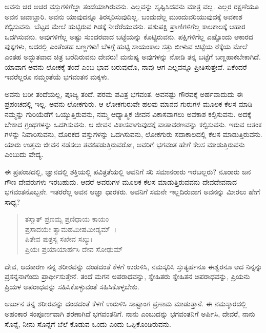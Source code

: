 ಅವನು ಚರ ಅಚರ ವಸ್ತುಗಳಿಗೆಲ್ಲಾ ತಂದೆಯಾಗಿರುವನು. ಎಲ್ಲವನ್ನು ಸೃಷ್ಟಿಸಿದವನು ಮಾತ್ರ ವಲ್ಲ. ಎಲ್ಲರ ರಕ್ಷಣೆಯೂ ಅವನ ಜವಾಬ್ದಾರಿ. ಅವನು ಯಾವುದನ್ನೂ ತಿರಸ್ಕರಿಸುವುದಿಲ್ಲ. ಬಂದುದೆಲ್ಲ ಮುಂದುವರಿಯುವುದಕ್ಕೆ ಅವಕಾಶ ಕಲ್ಪಿಸುವನು. ಬೆಟ್ಟದ ಮೇಲೆ ಹುಟ್ಟಿರುವ ಗಿಡಕ್ಕೆ ನೀರೆರೆಯುವನು. ಪಶುಪಕ್ಷಿ ಪ್ರಾಣಿಗಳಿಗೆಲ್ಲ ಕಾಲಕಾಲಕ್ಕೆ ಆಹಾರ ಒದಗಿಸುವನು. ಅವುಗಳಿಗೆಲ್ಲ ಅಷ್ಟು ಸುಂದರವಾದ ಬಟ್ಟೆಯನ್ನು ಕೊಟ್ಟಿರುವನು. ಪಕ್ಷಿಗಳಿಗೆಲ್ಲ ಎಷ್ಟೊಂದು ಆಕಾರದ ಪುಕ್ಕಗಳು, ಅದರಲ್ಲಿ ಎಂತೆಂತಹ ಬಣ್ಣಗಳು! ಬೆಳಗ್ಗೆ ಹುಟ್ಟಿ ಸಾಯಂಕಾಲ ಸತ್ತು ಬೀಳುವ ಚಿಟ್ಟೆಯ ರೆಕ್ಕೆಯ ಮೇಲೆ ಎಂತಹ ಅದ್ಭುತವಾದ ಚಿತ್ರ ಬರೆದಿರುವನು ದೇವರು! ಮನುಷ್ಯ ಅವುಗಳನ್ನು ನೋಡಿ ತನ್ನ ಬಟ್ಟೆಗೆ ಬಣ್ಣಹಾಕಬೇಕಾಗಿದೆ. ಯಾವಾಗ ಅವನು ಲೋಕಕ್ಕೆ ತಂದೆ ಎಂಬ ಭಾವ ಬರುವುದೊ, ನಾವು ಆಗ ಎಲ್ಲವನ್ನೂ ಪ್ರೀತಿಸುತ್ತೇವೆ. ಏಕೆಂದರೆ ಇವರೆಲ್ಲರೂ ನಮ್ಮಂತೆಯೆ ಭಗವಂತನ ಮಕ್ಕಳು.

ಅವನು ಬರೀ ತಂದೆಯಲ್ಲ, ಪೂಜ್ಯ ತಂದೆ. ಪರಮ ಪವಿತ್ರ ಭಗವಂತ. ಅವನಷ್ಟು ಗೌರವಕ್ಕೆ ಅರ್ಹವಾದುದು ಈ ಪ್ರಪಂಚದಲ್ಲಿ ಇಲ್ಲ. ಅವನು ಲೋಕಗುರು. ಆ ಲೋಕಗುರುವೇ ಹಲವು ಮಾನವ ಗುರುಗಳ ಮೂಲಕ ಕೆಲಸ ಮಾಡಿ ನಮ್ಮನ್ನು ಗುರಿಯೆಡೆಗೆ ಒಯ್ಯುತ್ತಿರುವನು, ನಮ್ಮ ಆಧ್ಯಾತ್ಮಿಕ ಜೀವನ ವಿಕಾಸವಾಗಲು ಅವಕಾಶ ಕಲ್ಪಿಸುವನು. ಅದಕ್ಕೆ ಬೇಕಾದ ಗ್ರಂಥಗಳನ್ನು ಒದಗಿಸುವನು. ಆ ಜೀವನ ವಿಕಾಸವಾಗುವುದಕ್ಕೆ ವಾತಾವರಣವನ್ನು ಕಲ್ಪಿಸುವನು. ಇರುವ ಆತಂಕ ಗಳನ್ನು ನಿವಾರಿಸುವನು, ದೊರಕದ ವಸ್ತುಗಳನ್ನು ಒದಗಿಸುವನು, ಲೋಕಗುರು ಸದಾಕಾಲದಲ್ಲಿ ಕೆಲಸ ಮಾಡುತ್ತಿರುವನು. ಯಾರು ಉತ್ತಮ ಜೀವನ ನಡೆಸಲು ತವಕಪಡುತ್ತಿರುವರೋ, ಅವರಿಗೆ ಭಗವಂತ ಹೇಗೆ ಕೆಲಸ ಮಾಡುತ್ತಿರುವನು ಎಂಬುದು ವೇದ್ಯ.

ಈ ಪ್ರಪಂಚದಲ್ಲಿ, ಜ್ಞಾನದಲ್ಲಿ ಶಕ್ತಿಯಲ್ಲಿ ಪವಿತ್ರತೆಯಲ್ಲಿ ಅವನಿಗೆ ಸರಿ ಸಮಾನರಾರು ಇರಬಲ್ಲರು? ನೂರಾರು ಜನ ಗೌಣ ದೇವರುಗಳು ಇರಬಹುದು. ಆದರೆ ಅವರುಗಳ ಮೂಲಕ ಕೆಲಸ ಮಾಡುತ್ತಿರುವವನು ದೇವದೇವನಾದ ಭಗವಂತನೊಬ್ಬನೇ. ಇತರರೆಲ್ಲ ಅವನ ಆಜ್ಞಾ ಧಾರಕರು. ಅವನಿಗೆ ಸಮನೇ ಇಲ್ಲದಿರುವಾಗ ಅವನನ್ನು ಮೀರಲು ಹೇಗೆ ಸಾಧ್ಯ?

\begin{verse}
ತಸ್ಮಾತ್ ಪ್ರಣಮ್ಯ ಪ್ರಣಿಧಾಯ ಕಾಯಂ \\ ಪ್ರಸಾದಯೇ ತ್ವಾಮಹಮೀಷಮೀಡ್ಯಮ್~।\\ಪಿತೇವ ಪುತ್ರಸ್ಯ ಸಖೇವ ಸಖ್ಯುಃ \\ ಪ್ರಿಯಃ ಪ್ರಯಾಯಾರ್ಹಸಿ ದೇವ ಸೋಢುಮ್ 
\end{verse}

{\small ದೇವ, ಆದಕಾರಣ ನನ್ನ ಶರೀರವನ್ನು ದಂಡದಂತೆ ಕೆಳಗೆ ಉರುಳಿಸಿ, ನಮಸ್ಕರಿಸಿ ಸ್ತುತ್ಯರ್ಹನೂ ಈಶ್ವರನೂ ಆದ ನಿನ್ನನ್ನು ಪ್ರಸನ್ನನಾಗೆಂದು ಪ್ರಾರ್ಥೀಸುತ್ತೇನೆ. ತಂದೆ ಮಗನ ಅಪರಾಧವನ್ನು, ಸ್ನೇಹಿತರು ಸ್ನೇಹಿತನ ಅಪರಾಧವನ್ನು, ಪ್ರಿಯನು ಪ್ರಿಯಳ ಅಪರಾಧವನ್ನು ಸಹಿಸಿಕೊಳ್ಳುವಂತೆ ಸಹಿಸಿಕೊಳ್ಳಬೇಕು.}

ಅರ್ಜುನ ತನ್ನ ಶರೀರವನ್ನು ದಂಡದಂತೆ ಕೆಳಗೆ ಉರುಳಿಸಿ ಸಾಷ್ಟಾಂಗ ಪ್ರಣಾಮ ಮಾಡುತ್ತಾನೆ. ಈ ನಮಸ್ಕಾರದಲ್ಲಿ ಅಹಂಕಾರ ಸಂಪೂರ್ಣವಾಗಿ ಶರಣಾಗಿದೆ ಭಗವಂತನಿಗೆ. ನಾನು ಎಂಬುದನ್ನು ಭಗವಂತನಿಗೆ ಅರ್ಪಿಸಿ, ದೇವರೆ, ನಾನು ಸೊನ್ನೆ, ನೀನು ಸೊನ್ನೆಗೆ ಬೆಲೆ ಕೊಡುವ ಒಂದು ಎಂದು ಒಪ್ಪಿಕೊಂಡಿರುವನು.

